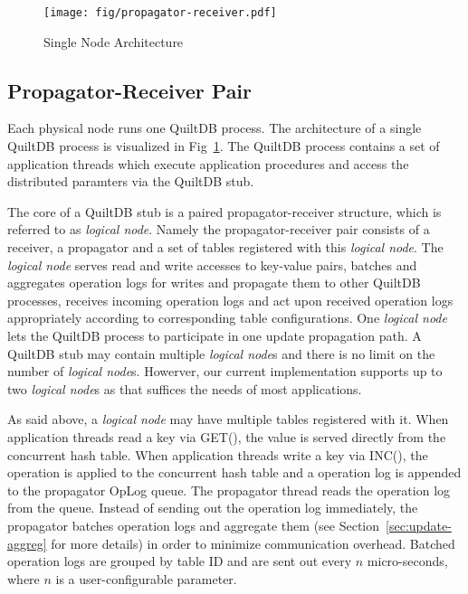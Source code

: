 \documentclass{acm_proc_article-sp}
\begin{document}
\begin{figure}[th!]
  \centering
  \texttt{[image: fig/propagator-receiver.pdf]}
  \caption{Single Node Architecture}
  \label{fig:prop-recv}
\end{figure}

\subsection{Propagator-Receiver Pair}

Each physical node runs one QuiltDB process. The architecture of a single 
QuiltDB process is visualized in Fig~\ref{fig:prop-recv}.  The QuiltDB process
contains a set of application threads which execute application procedures and 
access the distributed paramters via the QuiltDB stub. 

The core of a QuiltDB stub is a paired propagator-receiver structure, which is 
referred to as \emph{logical node}. Namely the propagator-receiver pair consists
of a receiver, a propagator and a set of tables registered with this 
\emph{logical node}. The \emph{logical node} serves read and write accesses to 
key-value pairs, batches and aggregates operation logs for writes and propagate 
them to other QuiltDB processes, receives incoming operation logs and act upon 
received operation logs appropriately according to corresponding table 
configurations. One \emph{logical node} lets the QuiltDB process to participate 
in one update propagation path. A QuiltDB stub may contain multiple 
\emph{logical node}s and there is no limit on the number of \emph{logical 
node}s. Howerver, our current implementation supports up to two \emph{logical 
node}s as that suffices the needs of most applications.

As said above, a \emph{logical node} may have multiple tables registered with it. 
When application threads read a key via GET(), the value is served directly from
the concurrent hash table. When application threads write a key via INC(), the 
operation is applied to the concurrent hash table and a operation log is 
appended to the propagator OpLog queue. The propagator thread reads the 
operation log from the queue. Instead of sending out the operation log 
immediately, the propagator batches operation logs and aggregate them (see
Section~\ref{sec:update-aggreg} for more details) in order to minimize 
communication overhead. Batched operation logs are grouped by table ID and are
sent out every $n$ micro-seconds, where $n$ is a user-configurable parameter.
\end{document}
